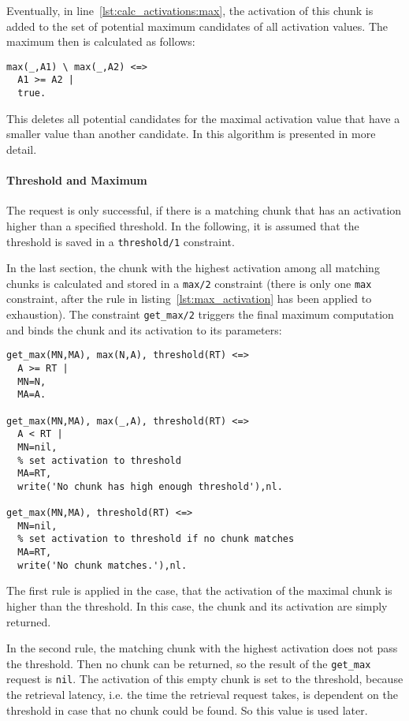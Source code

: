 Eventually, in line~\ref{lst:calc_activations:max}, the activation of this chunk is added to the set of potential maximum candidates of all activation values. The maximum then is calculated as follows:

\begin{lstlisting}[caption={Calculate highest activation of all matching chunks}, label=lst:max_activation]
max(_,A1) \ max(_,A2) <=> 
  A1 >= A2 |
  true.
\end{lstlisting}

This deletes all potential candidates for the maximal activation value that have a smaller value than another candidate. In \cite[19\psqq]{fru_chr_book_2009} this algorithm is presented in more detail.

\paragraph{Threshold and Maximum}

The request is only successful, if there is a matching chunk that has an activation higher than a specified threshold. In the following, it is assumed that the threshold is saved in a \verb|threshold/1| constraint.

In the last section, the chunk with the highest activation among all matching chunks is calculated and stored in a \verb|max/2| constraint (there is only one \verb|max| constraint, after the rule in listing~\ref{lst:max_activation} has been applied to exhaustion). The constraint \verb|get_max/2| triggers the final maximum computation and binds the chunk and its activation to its parameters:

\begin{lstlisting}
get_max(MN,MA), max(N,A), threshold(RT) <=> 
  A >= RT | 
  MN=N,
  MA=A.
  
get_max(MN,MA), max(_,A), threshold(RT) <=> 
  A < RT | 
  MN=nil,
  % set activation to threshold
  MA=RT,
  write('No chunk has high enough threshold'),nl.
  
get_max(MN,MA), threshold(RT) <=>
  MN=nil,
  % set activation to threshold if no chunk matches
  MA=RT,
  write('No chunk matches.'),nl.
\end{lstlisting}

The first rule is applied in the case, that the activation of the maximal chunk is higher than the threshold. In this case, the chunk and its activation are simply returned.

In the second rule, the matching chunk with the highest activation does not pass the threshold. Then no chunk can be returned, so the result of the \verb|get_max| request is \verb|nil|. The activation of this empty chunk is set to the threshold, because the retrieval latency, i.e. the time the retrieval request takes, is dependent on the threshold in case that no chunk could be found. So this value is used later.

